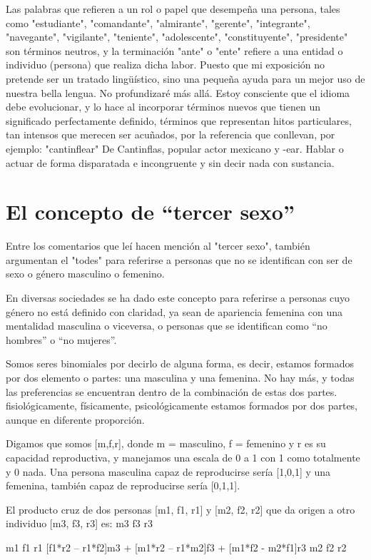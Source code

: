 Las palabras que refieren a un rol o papel que desempeña una persona, tales como "estudiante", "comandante", "almirante", "gerente", "integrante", "navegante", "vigilante", "teniente", "adolescente", "constituyente", "presidente" son términos neutros, y la terminación "ante" o "ente" refiere a una entidad o individuo (persona) que realiza dicha labor.
Puesto que mi exposición no pretende ser un tratado lingüístico, sino una pequeña ayuda para un mejor uso de nuestra bella lengua. No profundizaré más allá. Estoy consciente que el idioma debe evolucionar, y lo hace al incorporar términos nuevos que tienen un significado perfectamente definido, términos que representan hitos particulares, tan intensos que merecen ser acuñados, por la referencia que conllevan, por ejemplo: "cantinflear" De Cantinflas, popular actor mexicano y -ear. Hablar o actuar de forma disparatada e incongruente y sin decir nada con sustancia.

\section{El concepto de ``tercer sexo''}

Entre los comentarios que leí hacen mención al "tercer sexo", también argumentan el "todes" para referirse a personas que no se identifican con ser de sexo o género masculino o femenino.

En diversas sociedades se ha dado este concepto para referirse a personas cuyo género no está definido con claridad, ya sean de apariencia femenina con una mentalidad masculina o viceversa, o personas que se identifican como “no hombres” o “no mujeres”.

Somos seres binomiales por decirlo de alguna forma, es decir, estamos formados por dos elemento o partes: una masculina y una femenina. No hay más, y todas las preferencias se encuentran dentro de la combinación de estas dos partes. fisiológicamente, físicamente, psicológicamente estamos formados por dos partes, aunque en diferente proporción.

Digamos que somos [m,f,r], donde m = masculino, f = femenino y r es su capacidad reproductiva, y manejamos una escala de 0 a 1 con 1 como totalmente y 0 nada. Una persona masculina capaz de reproducirse sería [1,0,1] y una femenina, también capaz de reproducirse sería [0,1,1].

El producto cruz de dos personas [m1, f1, r1] y [m2, f2, r2] que da origen a otro individuo [m3, f3, r3] es:
m3
f3
r3

m1
f1
r1
[f1*r2 – r1*f2]m3 + [m1*r2 – r1*m2]f3 + [m1*f2 - m2*f1]r3
m2
f2
r2

